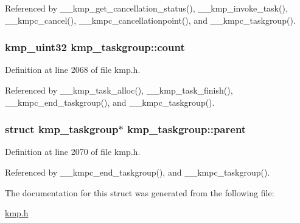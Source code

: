 Referenced by \-\_\-\-\_\-kmp\-\_\-get\-\_\-cancellation\-\_\-status(), \-\_\-\-\_\-kmp\-\_\-invoke\-\_\-task(), \-\_\-\-\_\-kmpc\-\_\-cancel(), \-\_\-\-\_\-kmpc\-\_\-cancellationpoint(), and \-\_\-\-\_\-kmpc\-\_\-taskgroup().

\hypertarget{structkmp__taskgroup_aa0ed4b8e5fd1730ebad7b0f3f3ebadf9}{
\subsubsection[{count}]{\setlength{\rightskip}{0pt plus 5cm}kmp\-\_\-uint32 kmp\-\_\-taskgroup\-::count}}\label{structkmp__taskgroup_aa0ed4b8e5fd1730ebad7b0f3f3ebadf9}


Definition at line 2068 of file kmp.\-h.



Referenced by \-\_\-\-\_\-kmp\-\_\-task\-\_\-alloc(), \-\_\-\-\_\-kmp\-\_\-task\-\_\-finish(), \-\_\-\-\_\-kmpc\-\_\-end\-\_\-taskgroup(), and \-\_\-\-\_\-kmpc\-\_\-taskgroup().

\hypertarget{structkmp__taskgroup_acc9d4f642b6a421dcdc66e44baeca4af}{
\subsubsection[{parent}]{\setlength{\rightskip}{0pt plus 5cm}struct {\bf kmp\-\_\-taskgroup}$\ast$ kmp\-\_\-taskgroup\-::parent}}\label{structkmp__taskgroup_acc9d4f642b6a421dcdc66e44baeca4af}


Definition at line 2070 of file kmp.\-h.



Referenced by \-\_\-\-\_\-kmpc\-\_\-end\-\_\-taskgroup(), and \-\_\-\-\_\-kmpc\-\_\-taskgroup().



The documentation for this struct was generated from the following file\-:\begin{DoxyCompactItemize}
\item 
\hyperlink{kmp_8h}{kmp.\-h}\end{DoxyCompactItemize}
